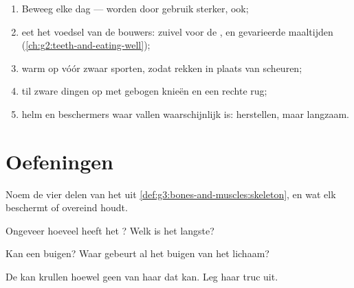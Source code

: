 \begin{method}\label{met:g3:bones-and-muscles:care}
\begin{enumerate}
  \item Beweeg elke dag ---  worden door gebruik sterker,  ook;
  \item eet het voedsel van de bouwers: zuivel voor de , en
        gevarieerde maaltijden (\cref{ch:g2:teeth-and-eating-well});
  \item warm op vóór zwaar sporten, zodat  rekken in plaats van
        scheuren;
  \item til zware dingen op met gebogen knieën en een rechte rug;
  \item helm en beschermers waar vallen waarschijnlijk is: 
        herstellen, maar langzaam.
\end{enumerate}
\end{method}

\section{Oefeningen}

\begin{exercise}[$\star$]\label{exo:g3:bones-and-muscles:1}
Noem de vier delen van het  uit
\cref{def:g3:bones-and-muscles:skeleton}, en wat elk beschermt of
overeind houdt.
\end{exercise}

\begin{exercise}[$\star$]\label{exo:g3:bones-and-muscles:2}
Ongeveer hoeveel  heeft het ? Welk  is het langste?
\end{exercise}

\begin{exercise}[$\star$]\label{exo:g3:bones-and-muscles:3}
Kan een  buigen? Waar gebeurt al het buigen van het lichaam?
\end{exercise}

\begin{exercise}[$\star$]\label{exo:g3:bones-and-muscles:4}
De  kan krullen hoewel geen van haar  dat kan. Leg
haar truc uit.
\end{exercise}

